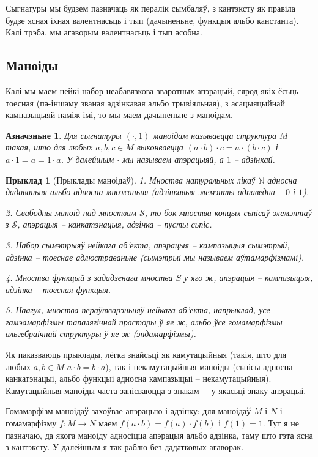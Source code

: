 \documentclass[a4paper,12pt]{book}
\newtheorem{example}{Прыклад}[section]
\newtheorem{definition}{Азначэньне}[section]
\begin{document}
Сыгнатуры мы будзем пазначаць як пералік сымбаляў, з кантэксту як
правіла будзе ясная іхная валентнасьць і тып (дачыненьне, функцыя
альбо канстанта). Калі трэба, мы агаворым валентнасьць і тып асобна.

\subsection{Маноіды}

Калі мы маем нейкі набор неабавязкова зваротных апэрацый, сярод якіх
ёсьць тоесная (па-іншаму званая адзінкавая альбо трывіяльная), з
асацыяцыйнай кампазыцыяй паміж імі, то мы маем
дачыненьне з маноідам.

\begin{definition}
  Для сыгнатуры $(\cdot, 1)$ маноідам называецца структура $M$ такая,
  што для любых $a, b, c \in M$ выконваецца $(a \cdot b) \cdot c = a
  \cdot (b \cdot c)$ і $a \cdot 1 = a = 1 \cdot a$. У далейшым $\cdot$
  мы называем апэрацыяй, а $1$ -- адзінкай.
\end{definition}

\begin{example}[Прыклады маноідаў]
  1. Мноства натуральных лікаў $\mathbb{N}$ адносна дадаваньня альбо адносна
  множаньня (адзінкавыя элемэнты адпаведна -- $0$ і $1$).

  2. Свабодны маноід над мноствам $\mathcal{S}$, то бок мноства
  концых сьпісаў элемэнтаў з $\mathcal{S}$, апэрацыя -- канкатэнацыя,
  адзінка -- пусты сьпіс.

  3. Набор сымэтрыяў нейкага аб'екта, апэрацыя -- кампазыцыя сымэтрый,
  адзінка -- тоеснае адлюстраваньне (сымэтрыі мы называем
  аўтамарфізмамі).

  4. Мноства функцый з зададзенага мноства $S$ у яго ж, апэрацыя --
  кампазыцыя, адзінка -- тоесная функцыя.

  5. Наагул, мноства пераўтварэньняў нейкага аб'екта, напрыклад, усе
  гамэамарфізмы тапалягічнай прасторы ў яе ж, альбо ўсе гомамарфізмы
  альгебраічнай структуры ў яе ж (эндамарфізмы).
\end{example}

Як паказваюць прыклады, лёгка знайсьці як камутацыйныя (такія, што для
любых $a, b \in M$ $a \cdot b = b \cdot a$), так і некамутацыйныя
маноіды (сьпісы адносна канкатэнацыі, альбо функцыі адносна кампазыцыі
-- некамутацыйныя). Камутацыйныя маноіды часта запісваюцца з знакам
$+$ у якасьці знаку апэрацыі.

Гомамарфізм маноідаў захоўвае апэрацыю і адзінку: для маноідаў $M$ і
$N$ і гомамарфізму $f:M \rightarrow N$ маем $f(a \cdot b) = f(a) \cdot
f(b)$ і $f(1) = 1$. Тут я не пазначаю, да якога маноіду адносіцца
апэрацыя альбо адзінка, таму што гэта ясна з кантэксту. У далейшым я
так раблю без дадатковых агаворак.
\end{document}
